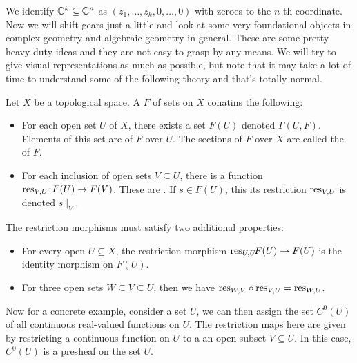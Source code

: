 We identify $\mathbb{C}^k \subseteq \mathbb{C}^n$ as $(z_1, \hdots, z_k, 0, \hdots, 0)$ with zeroes
to the $n$-th coordinate.\\

Now we will shift gears just a little and look at some very foundational objects in 
complex geometry and algebraic geometry in general. These are some pretty heavy duty
ideas and they are not easy to grasp by any means. We will try to give visual representations
as much as possible, but note that it may take a lot of time to understand some of
the following theory and that's totally normal.\\

\begin{definition}
    Let $X$ be a topological space. A  $F$ of sets on $X$ conatins
    the following:
    \begin{itemize}
        \item For each open set $U$ of $X$, there exists a set $F(U)$ denoted
        $\Gamma(U,F)$. Elements of this set are  of $F$ over $U$.
        The sections of $F$ over $X$ are called the  of $F$.
        \item For each inclusion of open sets $V \subseteq U$, there is a function
        $\textnormal{res}_{V,U} \hspace{-2pt}: \hspace{-2pt}F(U) \to F(V)$. These are .
        If $s \in F(U)$, this its restriction $\textnormal{res}_{V,U}$ is denoted $s \mid_V$.
    \end{itemize}
    The restriction morphisms must satisfy two additional properties:
    \begin{itemize}
        \item For every open $U \subseteq X$, the restriction morphism
        $\textnormal{res}_{U,U} \hspace{-5pt}:\hspace{-5pt} F(U) \to F(U)$ is the identity morphism on $F(U)$.
        \item For three open sets $W \subseteq V \subseteq U$, then we have
        $\textnormal{res}_{W,V} \circ \textnormal{res}_{V,U} = \textnormal{res}_{W,U}$.
    \end{itemize}
\end{definition}

Now for a concrete example, consider a set $U$, we can then assign the set $C^0(U)$
of all continuous real-valued functions on $U$. The restriction maps here are given
by restricting a continuous function on $U$ to a an open subset $V \subseteq U$.
In this case, $C^0(U)$ is a presheaf on the set $U$.\\

